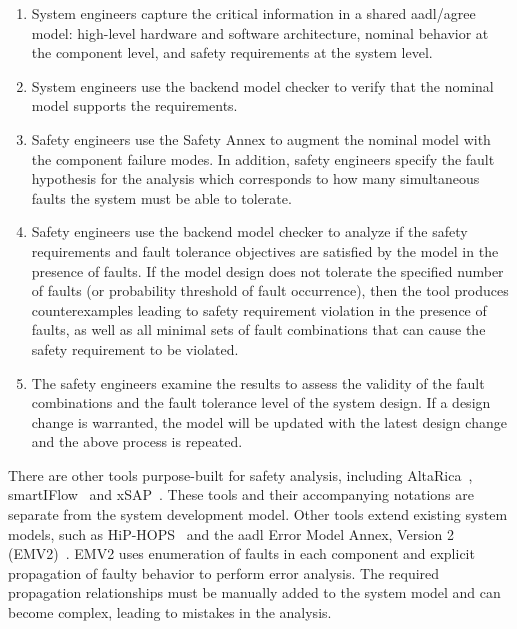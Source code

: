 \begin{enumerate}
	\item System engineers capture the critical information in a shared \gls{aadl}/\gls{agree} model:  high-level hardware and software architecture, nominal behavior at the component level, and safety requirements at the system level.%
	\item System engineers use the backend model checker to verify that the nominal model supports the requirements.
	\item Safety engineers use the Safety Annex to augment the nominal model with the component failure modes. %
	In addition, safety engineers specify the fault hypothesis for the analysis which corresponds to how many simultaneous faults the system must be able to tolerate.
	\item Safety engineers use the backend model checker to analyze if the safety requirements and fault tolerance objectives are satisfied by the model in the presence of faults. %
	If the model design does not tolerate the specified number of faults (or probability threshold of fault occurrence), then the tool produces counterexamples leading to safety requirement violation in the presence of faults, %
	 as well as all minimal sets of fault combinations that can cause the safety requirement to be violated.
	\item The safety engineers examine the results to assess the validity of the fault combinations and the fault tolerance level of the system design. If a design change is warranted, the model will be updated with the latest design change and the above process is repeated.
\end{enumerate}

There are other tools purpose-built for safety analysis, including AltaRica~\cite{PROSVIRNOVA2013127}, smartIFlow~\cite{info17:HaLuHo} and xSAP~\cite{DBLP:conf/tacas/BittnerBCCGGMMZ16}. These tools and their accompanying notations are separate from the system development model. Other tools extend existing system models, such as HiP-HOPS~\cite{CHEN201391} and the \gls{aadl} Error Model Annex, Version 2 (EMV2)~\cite{EMV2}. EMV2 uses enumeration of faults in each component and explicit propagation of faulty behavior to perform error analysis. The required propagation relationships must be manually added to the system model and can become complex, leading to mistakes in the analysis.

